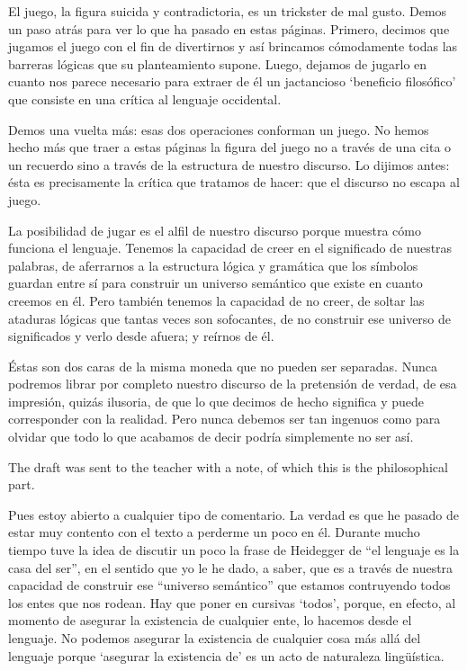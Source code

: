 El juego, la figura suicida y contradictoria,
es un trickster de mal gusto. Demos un paso
atrás para ver lo que ha pasado en estas
páginas. Primero, decimos que jugamos el
juego con el fin de divertirnos y así
brincamos cómodamente todas las barreras
lógicas que su planteamiento supone. Luego,
dejamos de jugarlo en cuanto nos parece
necesario para extraer de él un jactancioso
`beneficio filosófico' que consiste en una
crítica al lenguaje occidental.

Demos una vuelta más: esas dos operaciones
conforman un juego. No hemos hecho más que
traer a estas páginas la figura del juego no
a través de una cita o un recuerdo sino a
través de la estructura de nuestro discurso.
Lo dijimos antes: ésta es precisamente la
crítica que tratamos de hacer: que el
discurso no escapa al juego.

La posibilidad de jugar es el alfil de
nuestro discurso porque muestra cómo funciona
el lenguaje. Tenemos la capacidad de creer en
el significado de nuestras palabras, de
aferrarnos a la estructura lógica y gramática
que los símbolos guardan entre sí para
construir un universo semántico que existe en
cuanto creemos en él. Pero también tenemos la
capacidad de no creer, de soltar las ataduras
lógicas que tantas veces son sofocantes, de
no construir ese universo de significados y
verlo desde afuera; y reírnos de él.

Éstas son dos caras de la misma moneda que no
pueden ser separadas. Nunca podremos librar
por completo nuestro discurso de la
pretensión de verdad, de esa impresión,
quizás ilusoria, de que lo que decimos de
hecho significa y puede corresponder con la
realidad. Pero nunca debemos ser tan ingenuos
como para olvidar que todo lo que acabamos de
decir podría simplemente no ser así.

\medskip
The draft was sent to the teacher with a
note, of which this is the philosophical
part.

Pues estoy abierto a cualquier tipo de
comentario. La verdad es que he pasado de
estar muy contento con el texto a perderme un
poco en él. Durante mucho tiempo tuve la idea
de discutir un poco la frase de Heidegger de
``el lenguaje es la casa del ser'', en el
sentido que yo le he dado, a saber, que es a
través de nuestra capacidad de construir ese
``universo semántico'' que estamos
contruyendo todos los entes que nos rodean.
Hay que poner en cursivas `todos', porque, en
efecto, al momento de asegurar la existencia
de cualquier ente, lo hacemos desde el
lenguaje. No podemos asegurar la existencia
de cualquier cosa más allá del lenguaje
porque `asegurar la existencia de' es un acto
de naturaleza lingüística.

